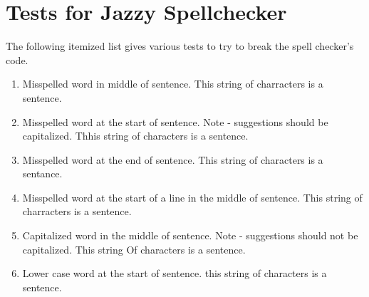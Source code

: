 \documentclass[11pt,a4paper]{article}
\begin{document}
\tableofcontents

\section{Tests for Jazzy Spellchecker}

The following itemized list gives various tests to try to break the 
spell checker's code.

\begin{enumerate}
\item Misspelled word in middle of sentence.
This string of charracters is a sentence.

\item Misspelled word at the start of sentence. Note - suggestions should be capitalized.
Thhis string of characters is a sentence.

\item Misspelled word at the end of sentence.
This string of characters is a sentance.

\item Misspelled word at the start of a line in the middle of sentence.
This string of 
charracters is a sentence.

\item Capitalized word in the middle of sentence. Note - suggestions should not be capitalized.
This string Of characters is a sentence.

\item Lower case word at the start of sentence. 
this string of characters is a sentence.
\end{enumerate}
%



\end{document}
